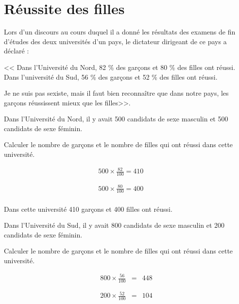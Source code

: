 \section{Réussite des filles}

Lors d'un discours au cours duquel il a donné les résultats des examens de fin d'études des deux universités d'un pays, le dictateur dirigeant de ce pays a déclaré :

<< Dans l'Université du Nord, 82 \% des garçons et 80 \% des filles ont réussi. Dans l'université du Sud, 56 \% des garçons et 52 \% des filles ont réussi.

Je ne suis pas sexiste, mais il faut bien reconnaître que dans notre pays, les garçons réussissent mieux que les filles>>.

\begin{questions}
	\question Dans l'Université du Nord, il y avait 500 candidats de sexe masculin et 500 candidats de sexe féminin.
	
	Calculer le nombre de garçons et le nombre de filles qui ont réussi dans cette université.
	
	\begin{solution}
		\begin{eqnarray*}
			500 \times \frac{82}{100} = 410 \\ 
			& & \\
			& & \\
			500 \times \frac{80}{100} = 400 \\
		\end{eqnarray*}
			

		
		Dans cette université 410 garçons et 400 filles ont réussi.
		
	\end{solution}
	
	\question Dans l'Université du Sud, il y avait 800 candidats de sexe masculin et 200 candidats de sexe féminin.
	
	Calculer le nombre de garçons et le nombre de filles qui ont réussi dans cette université.
	\begin{solution}
		\begin{eqnarray*}
			800 \times \frac{56}{100} & = & 448 \\ 
			& & \\
			& & \\
			200 \times \frac{52}{100} & = & 104 
		\end{eqnarray*}
			 

\end{solution}
\end{questions}
